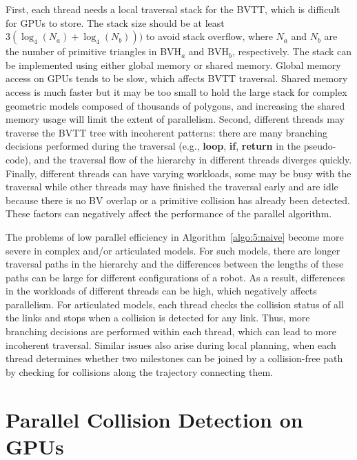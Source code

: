 First, each thread needs a local traversal stack for the BVTT, which is difficult for GPUs to store. The stack size should be at least $3 (\log_4(N_a) + \log_4(N_b)))$ to avoid stack overflow, where $N_a$ and $N_b$ are the number of primitive triangles in BVH$_a$ and
BVH$_b$, respectively.
The stack can be implemented using either global memory or shared memory. Global memory access on GPUs tends to be slow,
which affects BVTT traversal. Shared memory access is much faster but it may be too small to hold
the large stack for complex geometric models composed of thousands of polygons, and increasing the shared memory usage will limit the extent of parallelism.
Second, different threads may traverse the BVTT tree with incoherent patterns: there are many branching
decisions performed during the traversal (e.g., \textbf{loop}, \textbf{if}, \textbf{return} in the pseudo-code), and the traversal
flow of the hierarchy in different threads diverges quickly. Finally, different threads can have varying workloads, some may be
busy with the traversal while other threads may have finished the traversal early and are idle because
there is no BV overlap or a primitive collision has already been detected. These factors can negatively affect the
performance of the parallel algorithm.

The problems of low parallel efficiency in Algorithm~\ref{algo:5:naive} become more severe in complex and/or
articulated models. For such models, there are longer traversal paths in the hierarchy and the differences between
the lengths of these paths can be large for different configurations of a robot. As a result, differences in the
workloads of different threads can be high, which negatively affects parallelism. For articulated models, each thread checks the collision status
of all the links and stops when a collision is detected for any link. Thus, more branching decisions
are performed within each thread, which can lead to more incoherent traversal.
Similar issues also arise during local planning, when each thread determines whether two milestones
can be joined by a collision-free path by checking for collisions along the trajectory connecting them.



\section{Parallel Collision Detection on GPUs}
\label{sec:5:algorithm}


